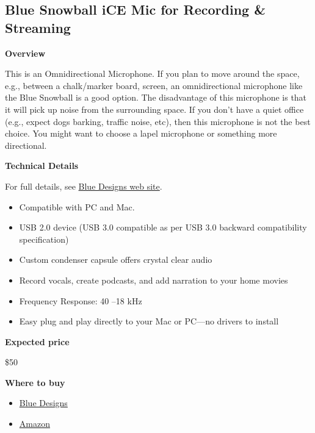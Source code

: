 \subsection{Blue Snowball iCE Mic for Recording \& Streaming}

\begin{gram}

\textbf{Overview}

This is an Omnidirectional Microphone. If you plan to move around the
space, e.g., between a chalk/marker board, screen, an omnidirectional
microphone like the Blue Snowball is a good option.
%
The disadvantage of this microphone is that it will pick up noise from the surrounding space.
%
If you don't have a quiet office (e.g., expect dogs barking, traffic noise, etc), then this microphone is not the best choice.  
%
You might want to choose a lapel microphone or something more directional.


\textbf{Technical Details}

For full details, see \href{https://www.bluedesigns.com/products/snowball-ice/}{Blue Designs web site}.

\begin{itemize}
\item
Compatible with PC and Mac.

\item  USB 2.0 device (USB 3.0 compatible as per USB 3.0 backward compatibility specification)

\item Custom condenser capsule offers crystal clear audio

\item Record vocals, create podcasts, and add narration to your home movies

\item Frequency Response: 40 –18 kHz

\item Easy plug and play directly to your Mac or PC—no drivers to install
\end{itemize}



\textbf{Expected price}

\$50


\textbf{Where to buy}


\begin{itemize}
\item 
\href{https://www.bluedesigns.com/products/snowball-ice/}{Blue Designs}

\item 
\href{https://www.amazon.com/Blue-Snowball-Condenser-Microphone-Cardioid/dp/B006DIA77E/ref=sxin_2_ac_d_rm?ac_md=1-1-c25vd2JhbGwgbWljcm9waG9uZQ%3D%3D-ac_d_rm&crid=35T8W1KNGCU61&cv_ct_cx=blue+yeti+usb+microphone&keywords=blue+yeti+usb+microphone&pd_rd_i=B006DIA77E&pd_rd_r=3aa58f9d-30b3-4a94-a0f9-899d4ec51554&pd_rd_w=TANss&pd_rd_wg=OOiJB&pf_rd_p=ec111f65-4a46-499c-be78-f47997212bd0&pf_rd_r=BKY12JJMDCSM54ABWTDX&psc=1&qid=1582900292&sprefix=Blue+ye,aps,168}{Amazon}
\end{itemize}

\end{gram}

